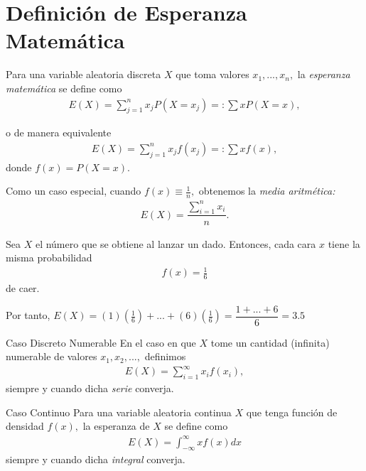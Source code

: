 
\section{Definición de Esperanza Matemática}


  Para una variable aleatoria discreta $X$ que toma valores $x_{1},...,x_{n},$ la \emph{esperanza matemática} se define como
  \begin{align}
   \label{eq:3.1}
   E(X)=\sum _{j=1}^{n} x_{j}P(X=x_{j})=:\sum xP(X=x),
  \end{align}

o de manera equivalente
  \begin{align}
   \label{eq:3.2}
   E(X)=\sum _{j=1}^{n} x_{j}f(x_{j})=:\sum xf(x),
  \end{align}
  donde $f(x)=P(X=x).$



 Como un caso especial, cuando $f(x)\equiv \frac{1}{n},$ obtenemos la \emph{media aritmética:}
 \begin{align}
  \label{eq:3.3}
  E(X)=\dfrac{\sum_{i=1}^{n}x_{i}}{n}.
 \end{align}


{}
\begin{exmp}
 Sea $X$ el número que se obtiene al lanzar un dado.  Entonces, cada cara $x$ tiene la misma probabilidad
 \begin{align*}
 f(x) = \frac{1}{6}
\end{align*} de caer.


Por tanto,
$E(X)= (1)\left( \frac{1}{6} \right)+...+(6)\left( \frac{1}{6} \right) = \dfrac{1+...+6}{6} = 3.5$
\end{exmp}



{Caso Discreto Numerable}
 En el caso en que $X$ tome un cantidad (infinita) numerable de valores $x_{1},x_{2},...,$ definimos
 \begin{align*}
  E(X)=\sum_{i=1}^{\infty}x_{i}f(x_{i}),
 \end{align*}
siempre y cuando dicha \emph{serie} converja.


%
%
% 

{Caso Continuo}
 Para una variable aleatoria continua $X$ que tenga función de densidad $f(x),$ la esperanza de $X$ se define como
 \begin{align}
  \label{eq:3.4}
  E(X)=\int_{-\infty}^{\infty}xf(x)dx
 \end{align}
siempre y cuando dicha \emph{integral} converja.


